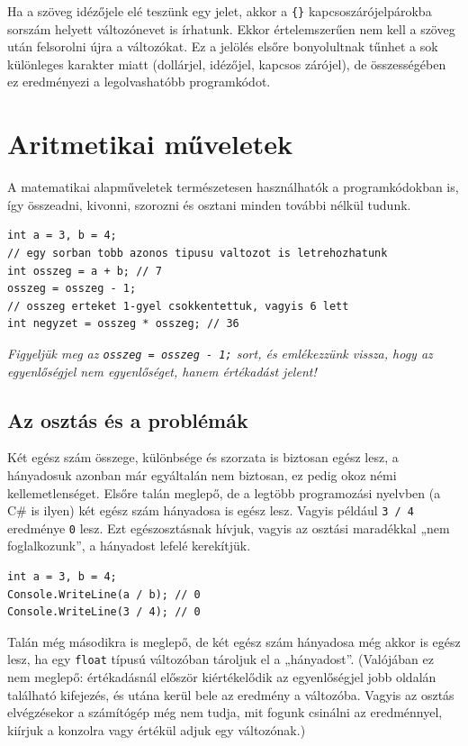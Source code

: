 \documentclass[a4paper]{article}
\begin{document}
Ha a szöveg idézőjele elé teszünk egy \within{\lstinline{\$}} jelet, akkor a \lstinline!{}! kapcsoszárójelpárokba sorszám helyett változónevet is írhatunk. Ekkor értelemszerűen nem kell a szöveg után felsorolni újra a változókat. Ez a jelölés elsőre bonyolultnak tűnhet a sok különleges karakter miatt (dollárjel, idézőjel, kapcsos zárójel), de összességében ez eredményezi a legolvashatóbb programkódot.

\section{Aritmetikai műveletek}
A matematikai alapműveletek természetesen használhatók a programkódokban is, így összeadni, kivonni, szorozni és osztani minden további nélkül tudunk.

\begin{lstlisting}[caption=Aritmetikai műveletek, label=lst:arithemtics]
int a = 3, b = 4;
// egy sorban tobb azonos tipusu valtozot is letrehozhatunk
int osszeg = a + b; // 7
osszeg = osszeg - 1;
// osszeg erteket 1-gyel csokkentettuk, vagyis 6 lett
int negyzet = osszeg * osszeg; // 36
\end{lstlisting}

\emph{Figyeljük meg az \lstinline{osszeg = osszeg - 1;} sort, és emlékezzünk vissza, hogy az egyenlőségjel nem egyenlőséget, hanem értékadást jelent!}

\subsection{Az osztás és a problémák}
Két egész szám összege, különbsége és szorzata is biztosan egész lesz, a hányadosuk azonban már egyáltalán nem biztosan, ez pedig okoz némi kellemetlenséget. Elsőre talán meglepő, de a legtöbb programozási nyelvben (a C\# is ilyen) két egész szám hányadosa is egész lesz. Vagyis például \lstinline{3 / 4} eredménye \lstinline{0} lesz. Ezt egészosztásnak hívjuk, vagyis az osztási maradékkal „nem foglalkozunk”, a hányadost lefelé kerekítjük.

\begin{lstlisting}[caption=Egészosztás, label=lst:intDiv]
int a = 3, b = 4;
Console.WriteLine(a / b); // 0
Console.WriteLine(3 / 4); // 0
\end{lstlisting}

Talán még másodikra is meglepő, de két egész szám hányadosa még akkor is egész lesz, ha egy \lstinline{float} típusú változóban tároljuk el a „hányadost”. (Valójában ez nem meglepő: értékadásnál először kiértékelődik az egyenlőségjel jobb oldalán található kifejezés, és utána kerül bele az eredmény a változóba. Vagyis az osztás elvégzésekor a számítógép még nem tudja, mit fogunk csinálni az eredménnyel, kiírjuk a konzolra vagy értékül adjuk egy változónak.)
\end{document}
